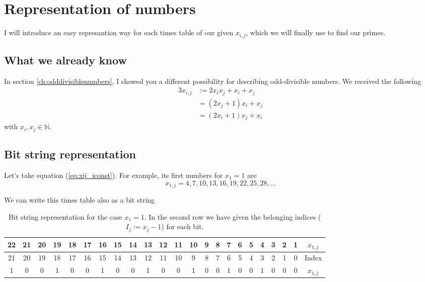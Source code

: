 \chapter{Representation of numbers}
\label{ch:representationofnumbers}
\minitoc
I will introduce an easy represantion way for each times table of our given $x_{i,j}$, which we will finally use to find our primes.
\section{What we already know}
\label{s:whatwealreadyknow}
In section \ref{ch:odddivisiblenumbers}, I showed you a different possibility for describing odd-divisible numbers. We received the following
\begin{alignat}{3}
	x_{i,j} &:= 2x_{i}x_{j} + x_{i} + x_{j} \label{eq:xij_gen} \\
	&= \left(2x_{j} + 1\right)x_{i} + x_{j} \label{eq:xij_jconst} \\
	&= \left(2x_{i} + 1\right)x_{j} + x_{i} \label{eq:xij_iconst}	
\end{alignat}
with $x_{i}, x_{j} \in \mathbb{N}$.
\section{Bit string representation}
\label{s:bitstringrepresantion}
Let's take equation (\ref{eq:xij_iconst}). For example, its first numbers for $x_{1} = 1$ are
\begin{equation}
	x_{1,j} = 4, 7, 10, 13, 16, 19, 22, 25, 28, \dots
\label{eq:xi1_firstnumbers}\end{equation}

We can write this times table also as a bit string

\begin{table}[H]
\centering
\caption{Bit string representation for the case $x_{1} = 1$. In the second row we have given the belonging indices ($I_{j} := x_{j} - 1$) for each bit.}
\tiny
\begin{tabular}{cccccccccccccccccccccc||c}
				\cellcolor{yellow} 22 & 21 & 20 & \cellcolor{yellow} 19 & 18 & 17 & \cellcolor{yellow} 16 & 15 & 14 & \cellcolor{yellow} 13 & 12 & 11 & \cellcolor{yellow} 10 & 9 & 8 & \cellcolor{yellow} 7 & 6 & 5 & \cellcolor{yellow} 4 & 3 & 2 & 1 & $x_{1,j}$ \\
\hline				21 & 20 & 19 & 18 & 17 & 16 & 15 & 14 & 13 & 12 & 11 & 10 & 9  & 8 & 7 & 6 & 5 & 4 & 3 & 2 & 1 & 0 & Index \\
\hline\hline \rowcolor{green}	\cellcolor{red} 1 &  0 &  0 &  \cellcolor{red} 1 &  0 &  0 & \cellcolor{red} 1 &  0 &  0 & \cellcolor{red} 1 &  0 &  0 & \cellcolor{red} 1 & 0 & 0 & \cellcolor{red} 1 & 0 & 0 & \cellcolor{red} 1 & 0 & 0 & 0 & $x_{1,j}$
\end{tabular}
\label{tab:bitstringx1_1}
\end{table}

